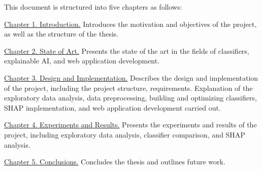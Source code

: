 This document is structured into five chapters as follows:

\hyperref[CAP:INTRODUCTION]{Chapter 1. Introduction.} Introduces the motivation and objectives of the project, as well as the structure of the thesis.

\hyperref[CAP:STATEOFTHEART]{Chapter 2. State of Art.} Presents the state of the art in the fields of classifiers, explainable AI, and web application development.

\hyperref[CAP:DESIGNIMPLEMENTATION]{Chapter 3. Design and Implementation.} Describes the design and implementation of the project, including the project structure, requirements. Explanation of the exploratory data analysis, data preprocessing, building and optimizing classifiers, SHAP implementation, and web application development carried out.

\hyperref[CAP:RESULTS]{Chapter 4. Experiments and Results.} Presents the experiments and results of the project, including exploratory data analysis, classifier comparison, and SHAP analysis.

\hyperref[CAP:CONCLUSIONS]{Chapter 5. Conclusions.} Concludes the thesis and outlines future work.